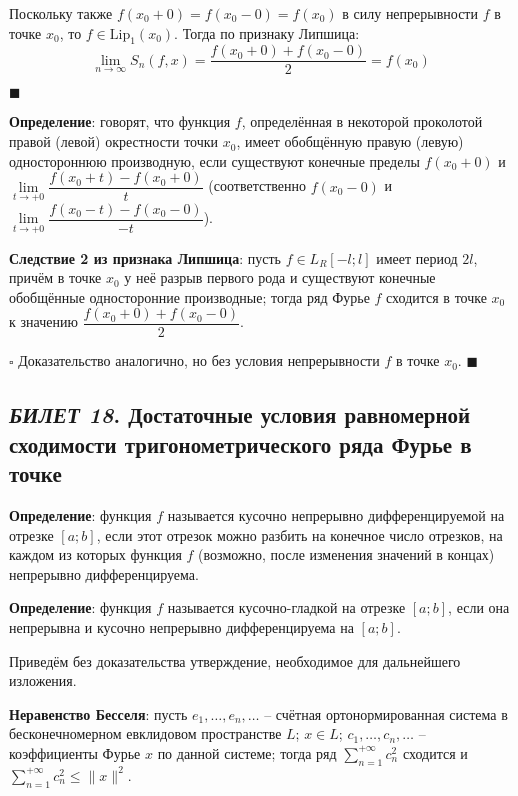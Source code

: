 \documentclass[12pt, a4paper, reqno]{article}
\begin{document}
    Поскольку также $f(x_0 + 0) = f(x_0 - 0) = f(x_0)$ в силу непрерывности $f$ в точке $x_0$, то
    $f \in \text{Lip}_{1}(x_0)$. Тогда по признаку Липшица:
    \begin{equation*}
        \lim\limits_{n \to \infty} S_n(f, x) = \frac{f(x_0 + 0) + f(x_0 - 0)}{2} = f(x_0)
    \end{equation*}

    $\blacksquare$

    \textbf{Определение}: говорят, что функция $f$, определённая в некоторой проколотой правой
    (левой) окрестности точки $x_0$, имеет обобщённую правую (левую) одностороннюю производную, если
    существуют конечные пределы $f(x_0 + 0)$ и $\lim\limits_{t \to +0}\dfrac{f(x_0 + t) - f(x_0 + 0)}{t}$
    (соответственно $f(x_0 - 0)$ и $\lim\limits_{t \to +0}\dfrac{f(x_0 - t) - f(x_0 - 0)}{-t}$).

    \textbf{Следствие 2 из признака Липшица}: пусть $f \in L_R[-l; l]$ имеет период $2l$, причём
    в точке $x_0$ у неё разрыв первого рода и существуют конечные обобщённые односторонние производные;
    тогда ряд Фурье $f$ сходится в точке $x_0$ к значению $\dfrac{f(x_0 + 0) + f(x_0 - 0)}{2}$.

    $\square$
    Доказательство аналогично, но без условия непрерывности $f$ в точке $x_0$.
    $\blacksquare$

\newpage
\subsection{\textit{БИЛЕТ 18}. Достаточные условия равномерной сходимости тригонометрического
            ряда Фурье в точке}

    \textbf{Определение}: функция $f$ называется кусочно непрерывно дифференцируемой на отрезке
    $[a; b]$, если этот отрезок можно разбить на конечное число отрезков, на каждом из которых
    функция $f$ (возможно, после изменения значений в концах) непрерывно дифференцируема.

    \textbf{Определение}: функция $f$ называется кусочно-гладкой на отрезке $[a; b]$, если она
    непрерывна и кусочно непрерывно дифференцируема на $[a; b]$.

    Приведём без доказательства утверждение, необходимое для дальнейшего изложения.

    \textbf{Неравенство Бесселя}: пусть $e_1, \ldots, e_n, \ldots$ -- счётная ортонормированная
    система в бесконечномерном евклидовом пространстве $L$; $x \in L$; $c_1, \ldots, c_n, \ldots$ --
    коэффициенты Фурье $x$ по данной системе; тогда ряд $\sum\limits_{n = 1}^{+\infty} c_n^2$
    сходится и $\sum\limits_{n = 1}^{+\infty} c_n^2 \leq \|x\|^2$.
\end{document}
